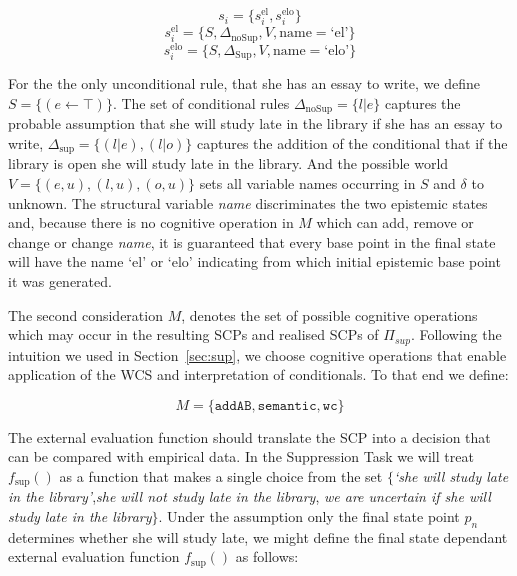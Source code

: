 \[s_i=\{s_i^\text{el},s_i^\text{elo}\}\]
\[s_i^\text{el}=\{S,\Delta_\text{noSup}, V, \text{name}=\text{`el'}\} \]
\[s_i^\text{elo}=\{S,\Delta_\text{Sup}, V, \text{name}=\text{`elo'}\} \]




For the the only unconditional rule, that she has an essay to write, we define $S=\{(e \leftarrow \top)\}$. The set of conditional rules $\Delta_{\text{noSup}}=\{l|e\}$ captures the probable assumption that she will study late in the library if she has an essay to write, $\Delta_{\text{sup}}=\{(l|e),(l|o)\}$ captures the addition of the conditional that if the library is open she will study late in the library. And the possible world $V=\{(e,u),(l,u),(o,u)\}$ sets all variable names occurring in $S$ and $\delta$ to unknown. The structural variable \textit{name} discriminates the two epistemic states and, because there is no cognitive operation in $M$ which can add, remove or change or change \textit{name}, it is guaranteed that every base point in the final state will have the name `el' or `elo' indicating from which initial epistemic base point it was generated.

The second consideration $M$, denotes the set of possible cognitive operations which may occur in the resulting SCPs and realised SCPs of $\Pi_{sup}$. Following the intuition we used in Section~\ref{sec:sup}, we choose cognitive operations that enable application of the WCS and interpretation of conditionals. To that end we define:

\[
M=\{\texttt{addAB}, \texttt{semantic}, \texttt{wc}\}
\]

The external evaluation function should translate the SCP into a decision that can be compared with empirical data. In the Suppression Task we will treat $f_\text{sup}()$ as a function that makes a single choice from the set $\{$\textit{`she will study late in the library'},\textit{she will not study late in the library}, \textit{we are uncertain if she will study late in the library}$\}$. Under the assumption only the final state point $p_n$ determines whether she will study late, we might define the final state dependant external evaluation function $f_\text{sup}()$ as follows:

